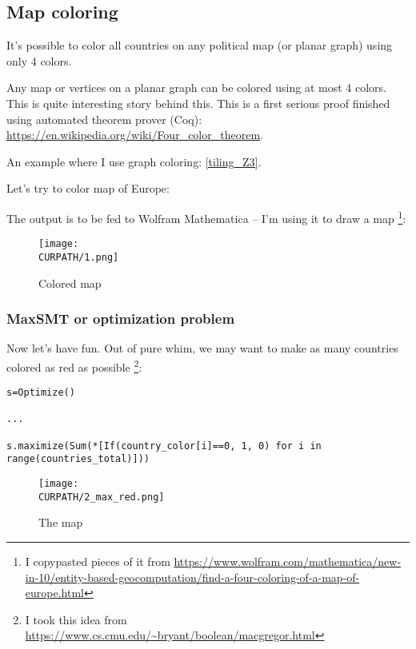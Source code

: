 \subsection{Map coloring}

\renewcommand{\CURPATH}{color/map}

It's possible to color all countries on any political map (or planar graph) using only 4 colors.

Any map or vertices on a planar graph can be colored using at most 4 colors.
This is quite interesting story behind this.
This is a first serious proof finished using automated theorem prover (Coq):
\url{https://en.wikipedia.org/wiki/Four_color_theorem}.

An example where I use graph coloring: \ref{tiling_Z3}.

Let's try to color map of Europe:



The output is to be fed to Wolfram Mathematica -- I'm using it to draw a map
\footnote{I copypasted pieces of it from \url{https://www.wolfram.com/mathematica/new-in-10/entity-based-geocomputation/find-a-four-coloring-of-a-map-of-europe.html}}:



\begin{figure}[H]
\centering
\texttt{[image: \\CURPATH/1.png]}
\caption{Colored map}
\end{figure}

\subsubsection{MaxSMT or optimization problem}

Now let's have fun.
Out of pure whim, we may want to make as many countries colored as red as possible
\footnote{I took this idea from \url{https://www.cs.cmu.edu/~bryant/boolean/macgregor.html}}:

\begin{lstlisting}
s=Optimize()

...

s.maximize(Sum(*[If(country_color[i]==0, 1, 0) for i in range(countries_total)]))
\end{lstlisting}

\begin{figure}[H]
\centering
\texttt{[image: \\CURPATH/2\_max\_red.png]}
\caption{The map}
\end{figure}


